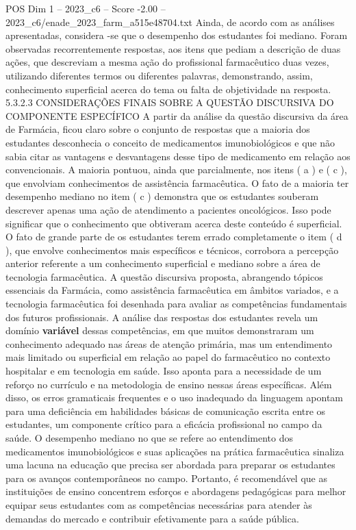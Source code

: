 \begin{textsample}{POS Dim 1 – 2023\_c6 – Score -2.00 – 2023\_c6/enade\_2023\_farm\_a515e48704.txt}
Ainda, de acordo com as análises apresentadas, considera -se que o desempenho dos estudantes foi mediano.
Foram observadas recorrentemente respostas, aos itens que pediam a descrição de duas ações, que descreviam a mesma ação do profissional farmacêutico duas vezes, utilizando diferentes termos ou diferentes palavras, demonstrando, assim, conhecimento superficial acerca do tema ou falta de objetividade na resposta. 5.3.2.3 CONSIDERAÇÕES FINAIS SOBRE A QUESTÃO DISCURSIVA DO COMPONENTE ESPECÍFICO A partir da análise da questão discursiva da área de Farmácia, ficou claro sobre o conjunto de respostas que a maioria dos estudantes desconhecia o conceito de medicamentos imunobiológicos e que não sabia citar as vantagens e desvantagens desse tipo de medicamento em relação aos convencionais.
A maioria pontuou, ainda que parcialmente, nos itens ( a ) e ( c ), que envolviam conhecimentos de assistência farmacêutica.
O fato de a maioria ter desempenho mediano no item ( c ) demonstra que os estudantes souberam descrever apenas uma ação de atendimento a pacientes oncológicos.
Isso pode significar que o conhecimento que obtiveram acerca deste conteúdo é superficial.
O fato de grande parte de os estudantes terem errado completamente o item ( d ), que envolve conhecimentos mais específicos e técnicos, corrobora a percepção anterior referente a um conhecimento superficial e mediano sobre a área de tecnologia farmacêutica.
A questão discursiva proposta, abrangendo tópicos essenciais da Farmácia, como assistência farmacêutica em âmbitos variados, e a tecnologia farmacêutica foi desenhada para avaliar as competências fundamentais dos futuros profissionais.
A análise das respostas dos estudantes revela um domínio \textbf{variável} dessas competências, em que muitos demonstraram um conhecimento adequado nas áreas de atenção primária, mas um entendimento mais limitado ou superficial em relação ao papel do farmacêutico no contexto hospitalar e em tecnologia em saúde.
Isso aponta para a necessidade de um reforço no currículo e na metodologia de ensino nessas áreas específicas.
Além disso, os erros gramaticais frequentes e o uso inadequado da linguagem apontam para uma deficiência em habilidades básicas de comunicação escrita entre os estudantes, um componente crítico para a eficácia profissional no campo da saúde.
O desempenho mediano no que se refere ao entendimento dos medicamentos imunobiológicos e suas aplicações na prática farmacêutica sinaliza uma lacuna na educação que precisa ser abordada para preparar os estudantes para os avanços contemporâneos no campo.
Portanto, é recomendável que as instituições de ensino concentrem esforços e abordagens pedagógicas para melhor equipar seus estudantes com as competências necessárias para atender às demandas do mercado e contribuir efetivamente para a saúde pública.

\end{textsample}
